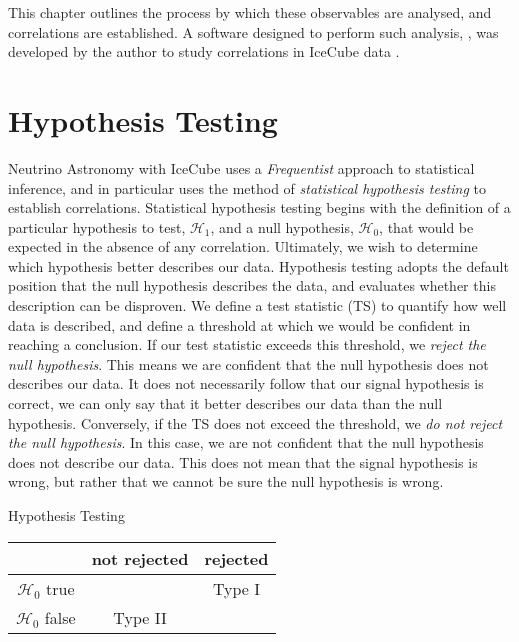 This chapter outlines the process by which these observables are analysed, and correlations are established. A software designed to perform such analysis,  \flarestack{}, was developed by the author to study correlations in IceCube data .

\section{Hypothesis Testing}
Neutrino Astronomy with IceCube uses a \emph{Frequentist} approach to statistical inference, and in particular uses the method of \emph{statistical hypothesis testing} to establish correlations. Statistical hypothesis testing begins with the definition of a particular hypothesis to test, $\mathcal{H_{1}}$, and a null hypothesis, $\mathcal{H_{0}}$, that would be expected in the absence of any correlation. Ultimately, we wish to determine which hypothesis better describes our data. Hypothesis testing adopts the default position that the null hypothesis describes the data, and evaluates whether this description can be disproven. We define a test statistic (TS) to quantify how well data is described, and define a threshold at which we would be confident in reaching a conclusion. If our test statistic exceeds this threshold, we \emph{reject the null hypothesis}. This means we are confident that the null hypothesis does not describes our data. It does not necessarily follow that our signal hypothesis is correct, we can only say that it better describes our data than the null hypothesis. Conversely, if the TS does not exceed the threshold,  we \emph{do not reject the null hypothesis}. In this case, we are not confident that the null hypothesis does not describe our data. This does not mean that the signal hypothesis is wrong, but rather that we cannot be sure the null hypothesis is wrong. 

\begin{margintable}
	\caption[]{Hypothesis Testing}
	\raggedright
	\begin{tabular}{ c|  c c}
		\hline
		& not rejected & rejected \\
		\hline
		$\mathcal{H_{0}}$ true & \cmark & Type I \\
		$\mathcal{H_{0}}$ false &Type II & \cmark\\
		\hline
	\end{tabular}
	\label{tab:hypothesis}
\end{margintable}

